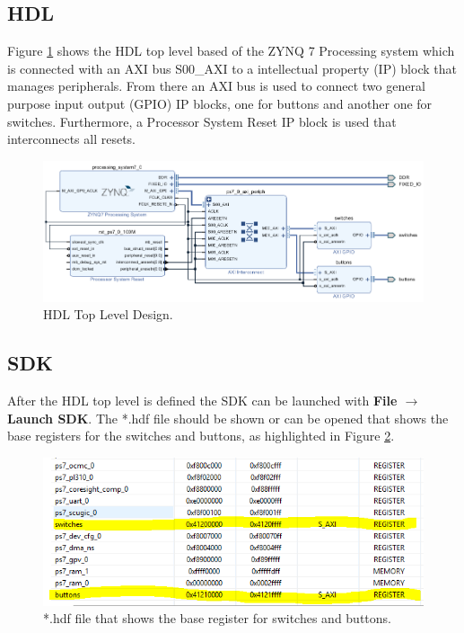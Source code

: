 \subsection{HDL}\label{subsec: HDL}
Figure \ref{fig: Vivado_lab_HDL_topView} shows the HDL top level based of the ZYNQ 7 Processing system which is connected with an AXI bus S00\_AXI to a intellectual property (IP) block that manages peripherals. From there an AXI bus is used to connect two general purpose input output (GPIO) IP blocks, one for buttons and another one for switches. Furthermore, a Processor System Reset IP block is used that interconnects all resets.
\begin{figure}[H]
	\centering
	\includegraphics[width=1.0\textwidth]{01_images/Vivado_lab_HDL_topView.PNG}
	\caption{HDL Top Level Design.}
	\label{fig: Vivado_lab_HDL_topView}
\end{figure}

\subsection{SDK}\label{subsec: SDK}
After the HDL top level is defined the SDK can be launched with \textbf{File $\rightarrow$ Launch SDK}. The *.hdf file should be shown or can be opened that shows the base registers for the switches and buttons, as highlighted in Figure \ref{fig: Vivado_lab4_SW_BTN_Register}. 
\begin{figure}[H]
	\centering
	\includegraphics[width=1.0\textwidth]{01_images/Vivado_lab4_SW_BTN_Register.PNG}
	\caption{*.hdf file that shows the base register for switches and buttons.}
	\label{fig: Vivado_lab4_SW_BTN_Register}
\end{figure}

